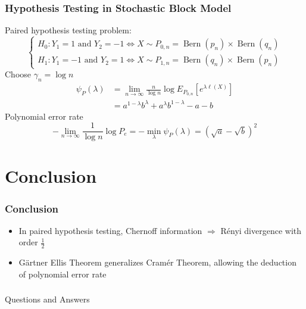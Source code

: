 \documentclass{beamer}
\DeclareMathOperator{\Bern}{Bern}
\begin{document}
\begin{frame}
\frametitle{
Hypothesis Testing in Stochastic Block Model} 
Paired hypothesis testing problem:
\begin{equation*}
\begin{cases}
H_0: Y_1 = 1 \textrm{ and } Y_2 = -1 \iff X \sim P_{0,n} = \Bern(p_n) \times \Bern(q_n)\\
H_1: Y_1 = -1 \textrm{ and } Y_2 = 1 \iff X \sim P_{1,n} = \Bern(q_n) \times \Bern(p_n)
\end{cases}
\end{equation*}
Choose $\gamma_n = \log n$
\begin{align*}
\psi_P(\lambda) &= \lim_{n\to \infty} \frac{n}{\log n} \log E_{P_{0,n}} [e^{\lambda \ell(X)}]\\
&=a^{1-\lambda}b^{\lambda}
+a^{\lambda}b^{1-\lambda} -a-b
\end{align*}
Polynomial error rate
\begin{equation*}
-\lim_{n\to\infty} \frac{1}{\log n}\log P_e = -\min_{\lambda} \psi_P(\lambda) = (\sqrt{a}-\sqrt{b})^2
\end{equation*}
\end{frame}
\section{Conclusion}
\begin{frame}
\frametitle{Conclusion}
\begin{itemize}
\item In paired hypothesis testing, Chernoff information $\Rightarrow$ Rényi divergence with order $\frac{1}{2}$
\item Gärtner Ellis Theorem generalizes Cramér Theorem, allowing the deduction of polynomial error rate
\end{itemize}
\end{frame}

\begin{frame}
\frametitle{}
\begin{block}{}
\centering
{\Huge Questions and Answers}
\end{block}
\end{frame}
\end{document}
